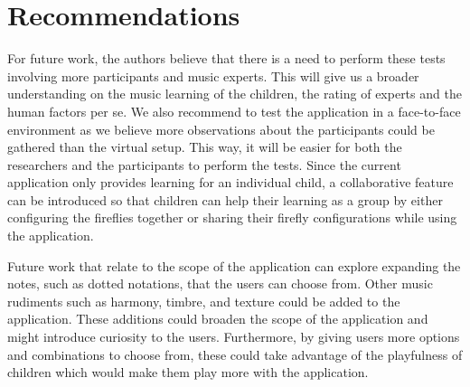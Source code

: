 \section{Recommendations}
For future work, the authors believe that there is a need to perform these tests involving more participants and music experts. This will give us a broader understanding on the music learning of the children, the rating of experts and the human factors per se. We also recommend to test the application in a face-to-face environment as we believe more observations about the participants could be gathered than the virtual setup. This way, it will be easier for both the researchers and the participants to perform the tests. Since the current application only provides learning for an individual child, a collaborative feature can be introduced so that children can help their learning as a group by either configuring the fireflies together or sharing their firefly configurations while using the application.

Future work that relate to the scope of the application can explore expanding the notes, such as dotted notations, that the users can choose from. Other music rudiments such as harmony, timbre, and texture could be added to the application. These additions could broaden the scope of the application and might introduce curiosity to the users. Furthermore, by giving users more options and combinations to choose from, these could take advantage of the playfulness of children which would make them play more with the application.



